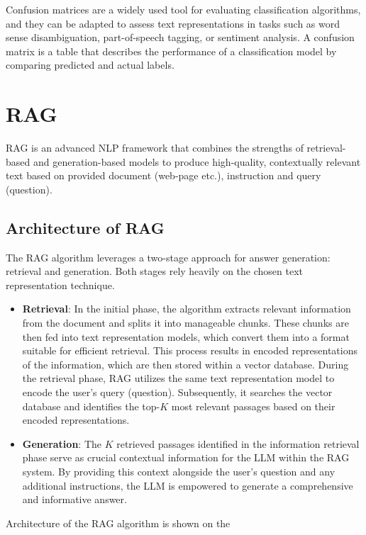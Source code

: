 Confusion matrices are a widely used tool for evaluating classification algorithms, and they can be adapted to assess text representations in tasks such as word sense disambiguation, part-of-speech tagging, or sentiment analysis.
A confusion matrix is a table that describes the performance of a classification model by comparing predicted and actual labels.

\section{\acf{RAG}}
\ac{RAG} \cite{lewis2021retrievalaugmented} is an advanced \ac{NLP} framework that combines the strengths of retrieval-based and generation-based models to produce high-quality, contextually relevant text based on provided document (web-page etc.), instruction and query (question). 

\subsection{Architecture of \ac{RAG}}
The \ac{RAG} algorithm leverages a two-stage approach for answer generation: retrieval and generation.
Both stages rely heavily on the chosen text representation technique.

\begin{itemize}
  \item \textbf{Retrieval}:
    In the initial phase, the algorithm extracts relevant information from the document and splits it into manageable chunks.
    These chunks are then fed into text representation models, which convert them into a format suitable for efficient retrieval.
    This process results in encoded representations of the information, which are then stored within a vector database.
    During the retrieval phase, \ac{RAG} utilizes the same text representation model to encode the user's query (question).
    Subsequently, it searches the vector database and identifies the top-$K$ most relevant passages based on their encoded representations.
  \item \textbf{Generation}:
    The $K$ retrieved passages identified in the information retrieval phase serve as crucial contextual information for the \ac{LLM} within the \ac{RAG} system.
    By providing this context alongside the user's question and any additional instructions, the \ac{LLM} is empowered to generate a comprehensive and informative answer.
\end{itemize}

Architecture of the \ac{RAG} algorithm is shown on the 

